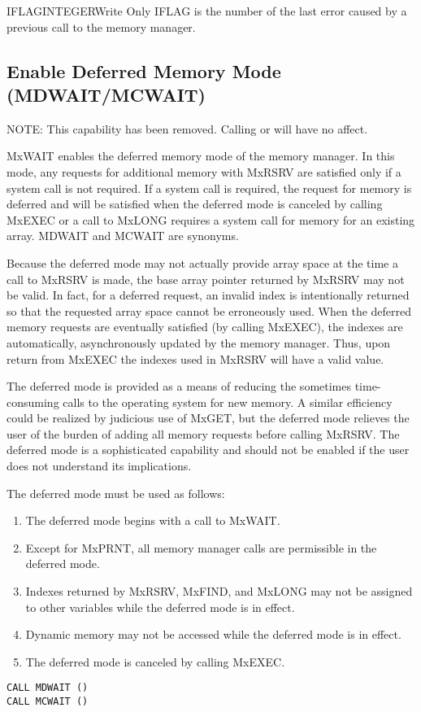 \begin{argy}{IFLAG}{INTEGER}{Write Only}
IFLAG is the number of the last error caused by a previous call to the
memory manager.
\end{argy}

\subsection{Enable Deferred Memory Mode (MDWAIT/MCWAIT)} \label{sec:wait}
NOTE: This capability has been removed.  Calling  or  will have no affect.

MxWAIT enables the deferred memory mode of the memory manager. In
this mode, any requests for additional memory with MxRSRV are
satisfied only if a system call is not required. If a system call is
required, the request for memory is deferred and will be satisfied when the
deferred mode is canceled by calling MxEXEC or a call to
MxLONG requires a system call for memory for an existing array.
MDWAIT and MCWAIT are synonyms.

Because the deferred mode may not actually provide array space at the time a
call to MxRSRV is made, the base array pointer re\-turn\-ed by
MxRSRV may not be valid. In fact, for a deferred request, an invalid
index is intentionally returned so that the requested array space cannot
be erroneously used. When the deferred memory requests are eventually
satisfied (by calling MxEXEC), the indexes are automatically,
asynchronously updated by the memory manager. Thus, upon return from
MxEXEC the indexes used in MxRSRV will have a valid value.

The deferred mode is provided as a means of reducing the sometimes
time-consuming calls to the operating system for new memory. A similar
efficiency could be realized by judicious use of MxGET, but the
deferred mode relieves the user of the burden of adding all memory requests
before calling MxRSRV. The deferred mode is a sophisticated
capability and should not be enabled if the user does not understand its
implications.

The deferred mode must be used as follows:
\begin{enumerate}
\item The deferred mode begins with a call to MxWAIT.
\item Except for MxPRNT, all memory manager calls are permissible
in the deferred mode.
\item Indexes returned by MxRSRV, MxFIND, and MxLONG
may not be assigned to other variables while the deferred mode is
in effect.
\item Dynamic memory may not be accessed while the deferred mode is in
effect.
\item The deferred mode is canceled by calling MxEXEC.
\end{enumerate}
\begin{verbatim}
CALL MDWAIT ()
CALL MCWAIT ()
\end{verbatim}

